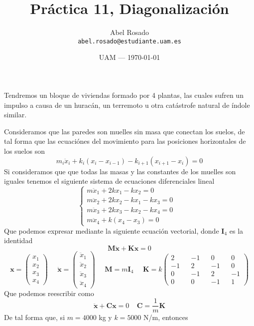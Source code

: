 \documentclass{article}
\title{Práctica 11, Diagonalización} %
\author{Abel Rosado\\ \texttt{abel.rosado@estudiante.uam.es}} %
\date{UAM --- \today} %
\begin{document}
\maketitle %


Tendremos un bloque de viviendas formado por 4 plantas, las cuales sufren un impulso a causa de un huracán, un terremoto u otra catástrofe natural de índole similar.

Consideramos que las paredes son muelles sin masa que conectan los suelos, de tal forma que las ecuaciónes del movimiento para las posiciones horizontales de los suelos son
\[m_i \ddot{x}_i+ k_i (x_i-x_{i-1})-k_{i+1}(x_{i+1}-x_i) = 0\]
Si consideramos que que todas las masas y las constantes de los muelles son iguales tenemos el siguiente sistema de ecuaciones diferenciales lineal
\[\left\{\begin{matrix}m \ddot{x}_1 +2 k x_1 -k x_2 = 0 \phantom{---} \\
m \ddot{x}_2 +2 k x_2 -k x_1 - k x_3 = 0 \\
m \ddot{x}_3 +2 k x_3 -k x_2 - k x_4 = 0 \\
m \ddot{x}_4 +k (x_4-x_3) = 0 \phantom{---} \end{matrix}\right.\]
Que podemos expresar mediante la siguiente ecuación vectorial, donde $\mathbf{I}_4$ es la identidad
\[\mathbf{M} \ddot{\mathbf{x}} + \mathbf{K} \mathbf{x} = 0\]
\[\mathbf{x} = \left(\begin{matrix}
	x_1 \\ x_2 \\ x_3 \\ x_4
\end{matrix}\right)\ \ \ \ \ \ \ddot{\mathbf{x}} = \left(\begin{matrix}
	\ddot{x}_1 \\ \ddot{x}_2 \\ \ddot{x}_3 \\ \ddot{x}_4
\end{matrix}\right)\ \ \ \ \ \ \mathbf{M} = m \mathbf{I}_4 \ \ \ \ \ \ \mathbf{K} = k\left(\begin{matrix}
	2 && -1 &&  0 &&  0 \\
   -1 &&  2 && -1 &&  0 \\
	0 && -1 &&  2 && -1 \\
	0 &&  0 && -1 && 1
\end{matrix}\right)\]
Que podemos reescribir como
\[\ddot{\mathbf{x}} + \mathbf{C} \mathbf{x} = 0 \ \ \ \ \  \mathbf{C} =\frac{1}{m}\mathbf{K}\]
De tal forma que, si $m=4000$ kg y $k = 5000$ N/m, entonces
\end{document}
